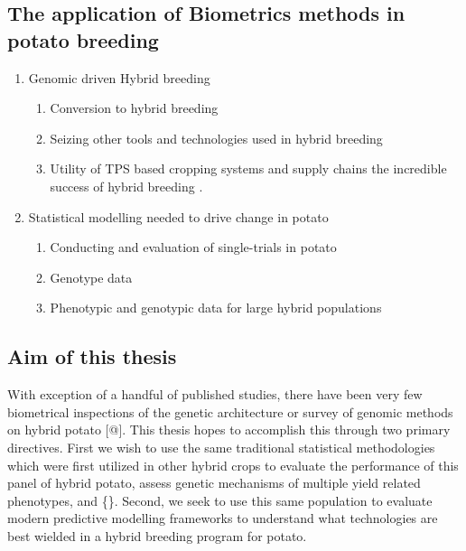 \documentclass[
]{article}
\providecommand{\tightlist}{%
  \setlength{\itemsep}{0pt}\setlength{\parskip}{0pt}}\usepackage{longtable,booktabs,array}
\begin{document}
\subsection{The application of Biometrics methods in potato
breeding}\label{the-application-of-biometrics-methods-in-potato-breeding}

\begin{enumerate}
\def\labelenumi{\arabic{enumi}.}
\setcounter{enumi}{4}
\tightlist
\item
  Genomic driven Hybrid breeding

  \begin{enumerate}
  \def\labelenumii{\roman{enumii})}
  \tightlist
  \item
    Conversion to hybrid breeding
  \item
    Seizing other tools and technologies used in hybrid breeding
  \item
    Utility of TPS based cropping systems and supply chains the
    incredible success of hybrid breeding \autocite{Crow1998}.
  \end{enumerate}
\item
  Statistical modelling needed to drive change in potato

  \begin{enumerate}
  \def\labelenumii{\roman{enumii})}
  \tightlist
  \item
    Conducting and evaluation of single-trials in potato
  \item
    Genotype data
  \item
    Phenotypic and genotypic data for large hybrid populations
  \end{enumerate}
\end{enumerate}

\subsection{Aim of this thesis}\label{aim-of-this-thesis}

With exception of a handful of published studies, there have been very
few biometrical inspections of the genetic architecture or survey of
genomic methods on hybrid potato {[}@{]}. This thesis hopes to
accomplish this through two primary directives. First we wish to use the
same traditional statistical methodologies which were first utilized in
other hybrid crops to evaluate the performance of this panel of hybrid
potato, assess genetic mechanisms of multiple yield related phenotypes,
and \{\}. Second, we seek to use this same population to evaluate modern
predictive modelling frameworks to understand what technologies are best
wielded in a hybrid breeding program for potato.
\end{document}
